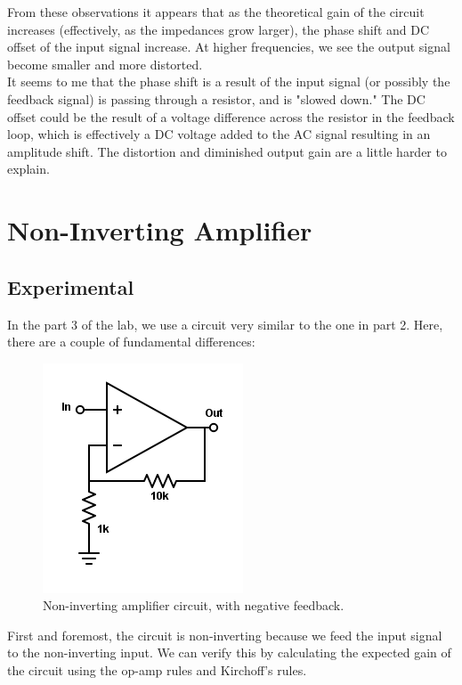 \documentclass[11pt]{article}
\begin{document}
From these observations it appears that as the theoretical gain of the circuit increases (effectively, as the impedances grow larger), the phase shift and DC offset of the input signal increase. At higher frequencies, we see the output signal become smaller and more distorted.\\

It seems to me that the phase shift is a result of the input signal (or possibly the feedback signal) is passing through a resistor, and is "slowed down." The DC offset could be the result of a voltage difference across the resistor in the feedback loop, which is effectively a DC voltage added to the AC signal resulting in an amplitude shift. The distortion and diminished output gain are a little harder to explain.\\


\section{Non-Inverting Amplifier}
\subsection{Experimental}

In the part 3 of the lab, we use a circuit very similar to the one in part 2. Here, there are a couple of fundamental differences:

\begin{figure}[H]
    \centering
    \includegraphics[scale=0.5]{Diagrams/c-c.png}
    \caption{Non-inverting amplifier circuit, with negative feedback.}
    \label{circuit:c}
\end{figure}

First and foremost, the circuit is non-inverting because we feed the input signal to the non-inverting input. We can verify this by calculating the expected gain of the circuit using the op-amp rules and Kirchoff's rules.
\end{document}
